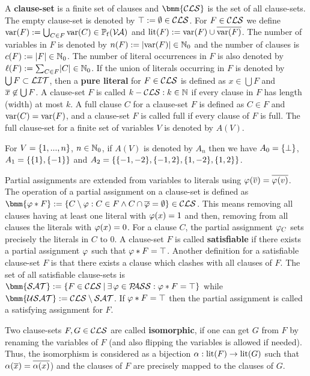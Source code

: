 \documentclass{report}
\begin{document}
A \textbf{clause-set} is a finite set of clauses and $\bmm{\Cls}$ is the set of all clause-sets. The empty clause-set is denoted by $\top := \emptyset \in \mathcal{CLS}$. For $F \in \mathcal{CLS}$ we define $\operatorname{var}(F) := \bigcup_{C \in F} \operatorname{var}(C) \in \operatorname{\mathbb{P}_f}(\mathcal{V\hspace{-0.1em}A})$ and $\operatorname{lit}(F) := \operatorname{var}(F) \cup \overline{\operatorname{var}(F)}$. The number of variables in $F$ is denoted by $n(F) := \lvert \operatorname{var}(F) \rvert \in \mathbb{N}_0$ and the number of clauses is $c(F) := \lvert F \rvert \in \mathbb{N}_0$. The number of literal occurrences in $F$ is also denoted by $\ell(F) := \sum_{C \in F} \lvert C \rvert \in \mathbb{N}_0$. If the union of literals occurring in $F$ is denoted by $\bigcup F \subset \mathcal{LIT}$, then a \textbf{pure literal} for $F \in \mathcal{CLS}$ is defined as $x \in \bigcup F$ and $\overline{x} \not \in \bigcup F$. A clause-set $F$ is called $k-\mathcal{CLS}: k \in \mathbb{N}$ if every clause in $F$ has length (width) at most $k$. A full clause $C$  for a clause-set $F$ is defined as $C \in F$ and $\operatorname{var}(C) = \operatorname{var}(F)$, and a clause-set $F$ is called full if every clause of $F$ is full. The full clause-set for a finite set of variables $V$ is denoted by $A(V)$. 

\begin{examp}\label{exp:An}
For $V=\{ 1,..., n \}$, $n \in \mathbb{N}_0$, if $A(V)$ is denoted by $A_n$ then we have $A_0 = \{ \bot \}$, $A_1 = \{ \{ 1 \},\{ -1 \} \}$ and $A_2 = \{ \{ -1,-2 \},\{ -1,2 \},\{ 1,-2 \},\{ 1,2 \} \}$.
\end{examp}

Partial assignments are extended from variables to literals using $\varphi(\overline{v})=\overline{\varphi(v)}$. The operation of a partial assignment on a clause-set is defined as $\bmm{\vp * F} := \set{C \sm \vp : C \in F \wedge C \cap \ol{\vp} = \es} \in \Cls$. This means removing all clauses having at least one literal with $\varphi (x)=1$ and then, removing from all clauses the literals with $\varphi (x)=0$. For a clause $C$, the partial assignment $\varphi_C$ sets precisely the literals in $C$ to 0. A clause-set $F$ is called \textbf{satisfiable} if there exists a partial assignment $\varphi$ such that $\varphi * F = \top$. Another definition for a satisfiable clause-set $F$ is that there exists a clause which clashes with all clauses of $F$. The set of all satisfiable clause-sets is $\bmm{\Sat} := \set{F \in \Cls \mb \ex\, \vp \in \Pass : \vp * F = \top}$ while $\bmm{\Usat} := \Cls \sm \Sat$. If $\varphi * F = \top$ then the partial assignment is called a satisfying assignment for $F$.

Two clause-sets $F, G \in \mathcal{CLS}$ are called \textbf{isomorphic}, if one can get $G$ from $F$ by renaming the variables of $F$ (and also flipping the variables is allowed if needed). Thus, the isomorphism is considered as a bijection $\alpha: \operatorname{lit}(F) \rightarrow \operatorname{lit}(G)$ such that $\alpha(\overline{x}) = \overline{\alpha(x)}$) and the clauses of $F$ are precisely mapped to the clauses of $G$. 
\end{document}
